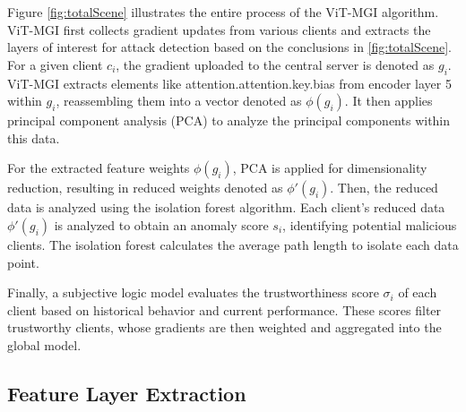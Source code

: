 \documentclass[conference]{IEEEtran}
\begin{document}

Figure \hyperref[fig:totalScene]{\ref{fig:totalScene}} illustrates the entire process of the ViT-MGI algorithm. ViT-MGI first collects gradient updates from various clients and extracts the layers of interest for attack detection based on the conclusions in \hyperref[fig:totalScene]{\ref{fig:totalScene}}. For a given client $c_i$, the gradient uploaded to the central server is denoted as $g_i$. ViT-MGI extracts elements like attention.attention.key.bias from encoder layer 5 within $g_i$, reassembling them into a vector denoted as $\phi(g_i)$. It then applies principal component analysis (PCA) to analyze the principal components within this data.

For the extracted feature weights $\phi(g_i)$, PCA is applied for dimensionality reduction, resulting in reduced weights denoted as $\phi'(g_i)$. Then, the reduced data is analyzed using the isolation forest algorithm. Each client’s reduced data $\phi'(g_i)$ is analyzed to obtain an anomaly score $s_i$, identifying potential malicious clients. The isolation forest calculates the average path length to isolate each data point.

Finally, a subjective logic model evaluates the trustworthiness score $\sigma_i$ of each client based on historical behavior and current performance. These scores filter trustworthy clients, whose gradients are then weighted and aggregated into the global model.

\subsection{Feature Layer Extraction}
\label{sec:method_layer}

\end{document}
